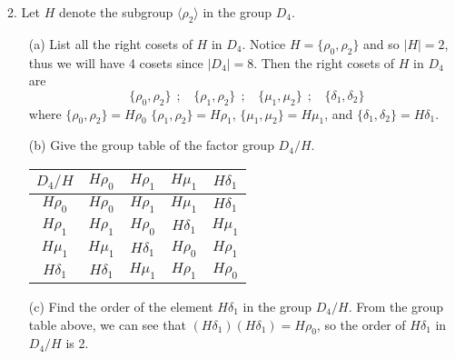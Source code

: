 \documentclass{article}
\begin{document}
2. Let $H$ denote the subgroup $\langle \rho_2 \rangle$ in the group $D_4$.
\begin{enumerate}
    \item[(a)] List all the right cosets of $H$ in $D_4$.
    \newline\newline
    Notice $H = \{\rho_0, \rho_2\}$ and so $|H| = 2$, thus we will have 4 cosets since $|D_4| = 8$. Then the right cosets of $H$ in $D_4$ are
    \[\{\rho_0, \rho_2\} \:\: ; \:\:\:\: \{\rho_1, \rho_2\} \:\: ; \:\:\:\: \{\mu_1, \mu_2\} \:\: ; \:\:\:\: \{\delta_1, \delta_2\}\]
    where $\{\rho_0, \rho_2\} = H\rho_0$ $\{\rho_1,\rho_2\} = H\rho_1$, $\{\mu_1, \mu_2\} = H\mu_1$, and $\{\delta_1, \delta_2\} = H\delta_1$. 
    
    
    \item[(b)] Give the group table of the factor group $D_4/H$.
    \newline\newline
    \begin{center}
        \begin{tabular}{c||c|c|c|c}
            $D_4/H$ & $H\rho_0$ & $H\rho_1$ & $H\mu_1$ & $H\delta_1$\\
            \hline\hline
            $H\rho_0$ & $H\rho_0$ & $H\rho_1$ & $H\mu_1$ & $H\delta_1$ \\
            \hline
            $H\rho_1$ & $H\rho_1$ & $H\rho_0$ & $H\delta_1$ & $H\mu_1$ \\
            \hline
            $H\mu_1$ & $H\mu_1$ & $H\delta_1$ & $H\rho_0$ & $H\rho_1$ \\
            \hline
            $H\delta_1$ & $H\delta_1$ & $H\mu_1$ & $H\rho_1$ & $H\rho_0$ \\
        \end{tabular}
    \end{center}
    
    \item[(c)] Find the order of the element $H\delta_1$ in the group $D_4/H$.
    \newline\newline
    From the group table above, we can see that $(H\delta_1)(H\delta_1) = H\rho_0$, so the order of $H\delta_1$ in $D_4/H$ is 2.
    

\end{enumerate}
\end{document}

